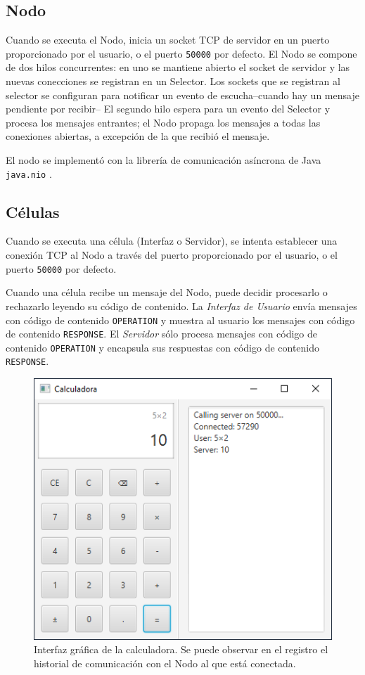 \documentclass[conference,compsoc]{IEEEtran}
\begin{document}
\subsection{Nodo}

Cuando se executa el Nodo, inicia un socket TCP de servidor en un puerto proporcionado por el usuario, o el puerto \texttt{50000} por defecto. El Nodo se compone de dos hilos concurrentes: en uno se mantiene abierto el socket de servidor y las nuevas conecciones se registran en un Selector. Los sockets que se registran al selector se configuran para notificar un evento de escucha--cuando hay un mensaje pendiente por recibir-- El segundo hilo espera para un evento del Selector y procesa los mensajes entrantes; el Nodo propaga los mensajes a todas las conexiones abiertas, a excepción de la que recibió el mensaje.

El nodo se implementó con la librería de comunicación asíncrona de Java \texttt{java.nio} \cite{java17NIO}.

\subsection{Células}

Cuando se executa una célula (Interfaz o Servidor), se intenta establecer una conexión TCP al Nodo a través del puerto proporcionado por el usuario, o el puerto \texttt{50000} por defecto.

Cuando una célula recibe un mensaje del Nodo, puede decidir procesarlo o rechazarlo leyendo su código de contenido. La \emph{Interfaz de Usuario} envía mensajes con código de contenido \texttt{OPERATION} y muestra al usuario los mensajes con código de contenido \texttt{RESPONSE}. El \emph{Servidor} sólo procesa mensajes con código de contenido \texttt{OPERATION} y encapsula sus respuestas con código de contenido \texttt{RESPONSE}.

\begin{figure}[hbt]
    \centering
    \includegraphics[width=0.9\columnwidth]{demo.png}
    \caption{Interfaz gráfica de la calculadora. Se puede observar en el registro el historial de comunicación con el Nodo al que está conectada.}
    \label{fig:demo}
\end{figure}
\end{document}
